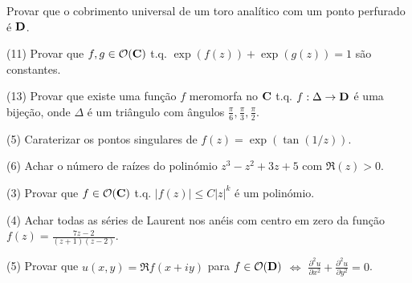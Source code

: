 \begin{prob}[(9)(mestrado)]
Provar que o cobrimento universal de um toro analítico com um ponto perfurado
é $\mathbf{D}$.
\end{prob}

\begin{prob} (11)
Provar que 
$f,g\in\mathcal{O}(\mathbf{C})$ t.q. $\exp(f(z)) + \exp(g(z)) = 1$
são constantes.
\end{prob}

\begin{prob} (13)
Provar que existe uma função $f$ meromorfa no $\mathbf{C}$ t.q. $f : \Delta \to \mathbf{D}$ é uma bijeção,
onde $\Delta$ é um triângulo com ângulos $\frac{\pi}{6},\frac{\pi}{3},\frac{\pi}{2}$.
\end{prob}

\begin{prob} (5)
Caraterizar os pontos singulares de $f(z) = \exp(\tan(1/z))$.
\end{prob}

\begin{prob} (6)
Achar o número de raízes do polinómio $z^3-z^2+3z+5$ com $\Re(z)>0$.
\end{prob}

\begin{prob} (3)
Provar que $f\in\mathcal{O}(\mathbf{C})$ t.q. $|f(z)|\leq C |z|^k$ é um polinómio.
\end{prob}

\begin{prob} (4)
Achar todas as séries de Laurent nos anéis com centro em zero da função $f(z) = \frac{7z-2}{(z+1)(z-2)}$.
\end{prob}

\begin{prob} (5)
Provar que $u(x,y) = \Re f(x+iy)$ para $f\in\mathcal{O}(\mathbf{D})$ $\iff$ 
$\frac{\partial^2 u}{\partial x^2} + \frac{\partial^2 u}{\partial y^2} = 0$.
\end{prob}

%


